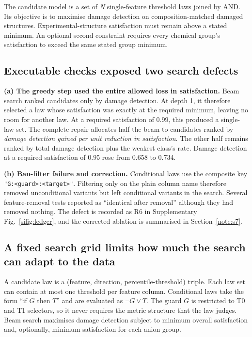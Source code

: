 The candidate model is a set of \emph{N} single-feature threshold laws joined by
AND. Its objective is to maximise damage detection on composition-matched damaged
structures. Experimental-structure satisfaction must remain above a stated
minimum. An optional second constraint requires every chemical group's
satisfaction to exceed the same stated group minimum.

\subsection{Executable checks exposed two search defects}\label{s4.2-two-defects-found-in-our-own-search}

\textbf{(a) The greedy step used the entire allowed loss in satisfaction.} Beam
search ranked candidates only by damage detection. At depth 1, it therefore
selected a law whose satisfaction was exactly at the required minimum, leaving
no room for another law. At a required satisfaction of 0.99, this produced a
single-law set. The complete repair allocates half the beam to candidates ranked
by \emph{damage detection gained per unit reduction in satisfaction}. The other
half remains ranked by total damage detection plus the weakest class's rate.
Damage detection at a required satisfaction of 0.95 rose from
0.658 to 0.734.

\textbf{(b) Ban-filter failure and correction.} Conditional laws use the
composite key \texttt{"G:\textless{}guard\textgreater{}:\textless{}target\textgreater{}"}.
Filtering only on the plain column name therefore removed unconditional variants
but left conditional variants in the search. Several feature-removal tests
reported as ``identical after removal'' although they had removed nothing.
The defect is recorded as R6 in Supplementary Fig.~\ref{sifig:ledger}, and the corrected
ablation is summarised in Section~\ref{note:s7}.

\subsection{A fixed search grid limits how much the search can adapt to the data}\label{s4.3-search-configuration}

A candidate law is a (feature, direction, percentile-threshold) triple. Each law
set can contain at most one threshold per feature column. Conditional laws take
the form ``if $G$ then $T$'' and are evaluated as $\neg G \vee T$. The guard
$G$ is restricted to T0 and T1 selectors, so it never requires the metric
structure that the law judges. Beam search maximises damage detection subject to
minimum overall satisfaction and, optionally, minimum satisfaction for each
anion group.


